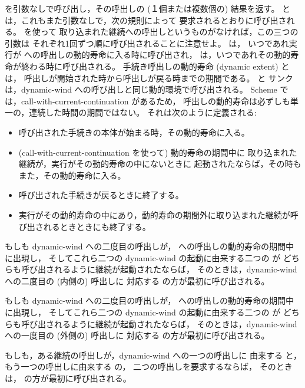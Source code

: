 \begin{entry}{%
}

 を引数なしで呼び出し，その呼出しの (１個または複数個の) 結果を返す。
 と  は，これもまた引数なしで，次の規則によって
要求されるとおりに呼び出される。
 を使って
取り込まれた継続への呼出しというものがなければ，この三つの引数は
それぞれ1回ずつ順に呼び出されることに注意せよ。
 は，
いつであれ実行が  への呼出しの動的寿命に入る時に呼び出され，
 は，いつであれその動的寿命が終わる時に呼び出される。
手続き呼出しの動的寿命 (dynamic extent) とは，
呼出しが開始された時から呼出しが戻る時までの期間である。
 と  サンクは，{\cf dynamic-wind}
への呼び出しと同じ動的環境で呼び出される。
Scheme では，{\cf call-with-current-continuation} があるため，
呼出しの動的寿命は必ずしも単一の，連続した時間の期間ではない。
それは次のように定義される:
\begin{itemize}
\item 呼び出された手続きの本体が始まる時，その動的寿命に入る。

\item ({\cf call-with-current-continuation} を使って) 動的寿命の期間中に
取り込まれた継続が，実行がその動的寿命の中にないときに
起動されたならば，その時もまた，その動的寿命に入る。

\item 呼び出された手続きが戻るときに終了する。

\item 実行がその動的寿命の中にあり，動的寿命の期間外に取り込まれた継続が呼び出されるときときにも終了する。
\end{itemize}

もしも {\cf dynamic-wind} への二度目の呼出しが，
 への呼出しの動的寿命の期間中に出現し，
そしてこれら二つの {\cf dynamic-wind} の起動に由来する二つの  が
どちらも呼び出されるように継続が起動されたならば，
そのときは，{\cf dynamic-wind} への二度目の (内側の) 呼出しに
対応する  の方が最初に呼び出される。

もしも {\cf dynamic-wind} への二度目の呼出しが，
 への呼出しの動的寿命の期間中に出現し，
そしてこれら二つの {\cf dynamic-wind} の起動に由来する二つの  が
どちらも呼び出されるように継続が起動されたならば，
そのときは，{\cf dynamic-wind} への一度目の (外側の) 呼出しに
対応する  の方が最初に呼び出される。

もしも，ある継続の呼出しが，{\cf dynamic-wind} への一つの呼出しに
由来する  と，もう一つの呼出しに由来する  の，
二つの呼出しを要求するならば，
そのときは， の方が最初に呼び出される。


\end{entry}
